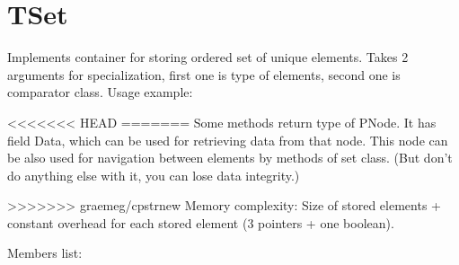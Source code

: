 \chapter{TSet}

Implements container for storing ordered set of unique elements.
Takes 2 arguments for specialization, first one is type of elements, second one is comparator class.
Usage example:



<<<<<<< HEAD
=======
Some methods return type of PNode. It has field Data, which can be used for retrieving data from
that node. This node can be also used for navigation between elements by methods of set class.
(But don't do anything else with it, you can lose data integrity.)

>>>>>>> graemeg/cpstrnew
Memory complexity:
Size of stored elements + constant overhead for each stored element (3 pointers + one boolean).

Members list:

